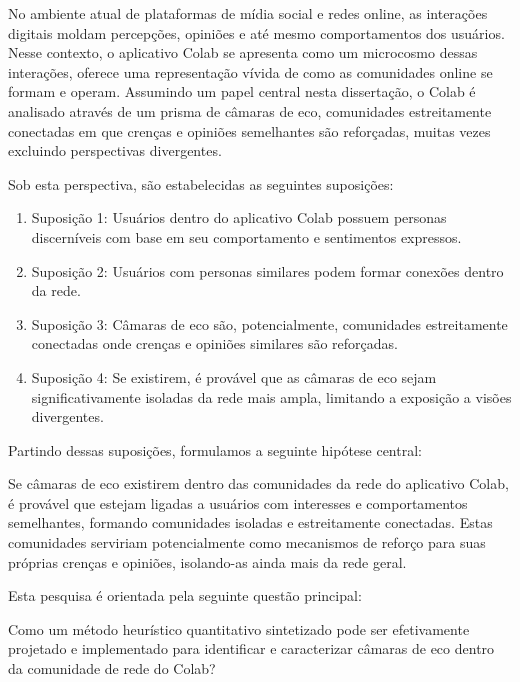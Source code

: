 No ambiente atual de plataformas de mídia social e redes online, as interações digitais moldam percepções, opiniões e até mesmo comportamentos dos usuários. Nesse contexto, o aplicativo Colab se apresenta como um microcosmo dessas interações, oferece uma representação vívida de como as comunidades online se formam e operam. Assumindo um papel central nesta dissertação, o Colab é analisado através de um prisma de câmaras de eco, comunidades estreitamente conectadas em que crenças e opiniões semelhantes são reforçadas, muitas vezes excluindo perspectivas divergentes.

Sob esta perspectiva, são estabelecidas as seguintes suposições:

\begin{enumerate}
    \item Suposição 1: Usuários dentro do aplicativo Colab possuem personas discerníveis com base em seu comportamento e sentimentos expressos.
    \item Suposição 2: Usuários com personas similares podem formar conexões dentro da rede.
    \item Suposição 3: Câmaras de eco são, potencialmente, comunidades estreitamente conectadas onde crenças e opiniões similares são reforçadas.
    \item Suposição 4: Se existirem, é provável que as câmaras de eco sejam significativamente isoladas da rede mais ampla, limitando a exposição a visões divergentes.
\end{enumerate}

Partindo dessas suposições, formulamos a seguinte hipótese central:

\begin{citacao}
Se câmaras de eco existirem dentro das comunidades da rede do aplicativo Colab, é provável que estejam ligadas a usuários com interesses e comportamentos semelhantes, formando comunidades isoladas e estreitamente conectadas. Estas comunidades serviriam potencialmente como mecanismos de reforço para suas próprias crenças e opiniões, isolando-as ainda mais da rede geral.
\end{citacao}

Esta pesquisa é orientada pela seguinte questão principal:

\begin{citacao}
    Como um método heurístico quantitativo sintetizado pode ser efetivamente projetado e implementado para identificar e caracterizar câmaras de eco dentro da comunidade de rede do Colab?
\end{citacao}

